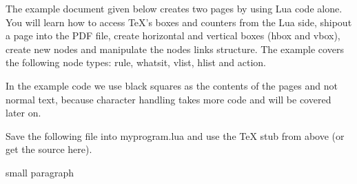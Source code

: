 \documentclass[draft]{article}
\begin{document}
The example document given below creates two pages by using Lua code alone. You
will learn how to access TeX's boxes and counters from the Lua side, shipout a
page into the PDF file, create horizontal and vertical boxes (hbox and vbox),
create new nodes and manipulate the nodes links structure. The example covers
the following node types: rule, whatsit, vlist, hlist and action.

In the example code we use black squares as the contents of the pages and not
normal text, because character handling takes more code and will be covered
later on.

Save the following file into myprogram.lua and use the TeX stub from above (or
get the source here). 

small paragraph
\end{document}
